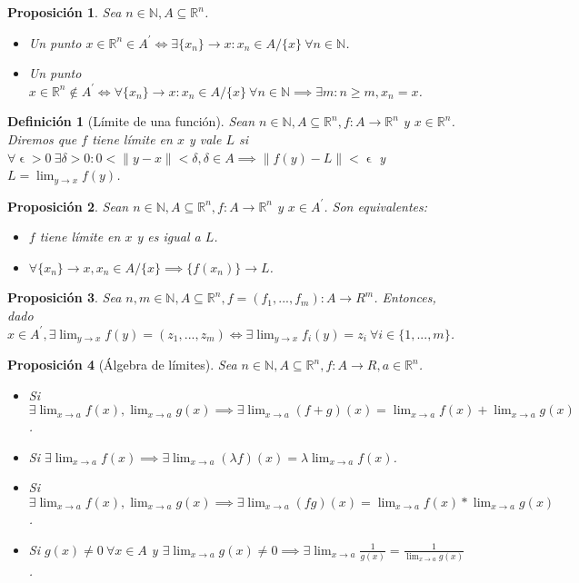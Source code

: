 \documentclass[11pt, a4paper]{article}
\newif\IfInSansMode
\let\epsilon\upvarepsilon
\newcommand{\R}{\mathbb{R}} \newcommand{\N}{\mathbb{N}}
\newcommand{\xn}{\{x_n\}}
\theoremstyle{theorem-style}
\newtheorem{nprop}{Proposición}[section]
\theoremstyle{definition-style}
\newtheorem{ndef}{Definición}[section]
\theoremstyle{remark-style}
\theoremstyle{example-style}
\begin{document}
\begin{nprop}
Sea $n \in \N, A \subseteq \R^n$.

\begin{itemize}
	\item Un punto $x \in \R^n \in A^{'} \Leftrightarrow \exists \xn \to x : x_n \in A/\{x\} \ \forall n \in \N$.
	\item Un punto $x \in \R^n \not\in A^{'} \Leftrightarrow \forall \xn \to x : x_n \in A/\{x\} \ \forall n \in \N \implies \exists m: n \ge m, x_n = x$.
\end{itemize}
\end{nprop}

\begin{ndef}[Límite de una función]
Sean $n \in \N, A \subseteq \R^n, f:A \to \R^n$ y $x \in \R^n$. Diremos que $f$ tiene límite en $x$ y vale $L$ si $ \forall \epsilon > 0 \ \exists \delta > 0: 0 < \|y-x\| < \delta, \delta \in A \implies \|f(y)-L\| < \epsilon$ y $L = \lim_{y \to x} f(y)$.
\end{ndef}

\begin{nprop}
	Sean $n \in \N, A \subseteq \R^n, f:A \to \R^n$ y $x \in A^{'}$. Son equivalentes:
	
	\begin{itemize}
		\item $f$ tiene límite en $x$ y es igual a $L$.
		\item $\forall \xn \to x, x_n \in A/\{x\} \implies \{f(x_n)\} \to L$.
	\end{itemize}
\end{nprop}

\begin{nprop}
	Sea $n,m \in \N, A \subseteq \R^n, f = (f_1,...,f_m):A \to R^m$. Entonces, dado $x \in A^{'}, \exists \lim_{y \to x} f(y) = (z_1,...,z_m) \Leftrightarrow \exists \lim_{y \to x} f_i(y) = z_i \ \forall i \in \{1,...,m\}$.
\end{nprop}

\begin{nprop}[Álgebra de límites]
	Sea $n \in \N, A \subseteq \R^n, f:A \to R, a \in \R^n$. 
	\begin{itemize}
		\item Si $\exists \lim_{x \to a} f(x), \lim_{x \to a} g(x) \implies \exists \lim_{x \to a} (f+g)(x) = \lim_{x \to a} f(x)+\lim_{x \to a} g(x)$.
		\item Si $ \exists \lim_{x \to a} f(x) \implies \exists \lim_{x \to a} (\lambda f)(x) = \lambda \lim_{x \to a} f(x)$.
		\item Si $ \exists \lim_{x \to a} f(x), \lim_{x \to a} g(x) \implies \exists \lim_{x \to a} (fg)(x) = \lim_{x \to a} f(x)*\lim_{x \to a} g(x)$.
		\item Si $g(x) \ne 0 \ \forall x \in A$ y $ \exists \lim_{x \to a} g(x) \ne 0 \implies \exists \lim_{x \to a} \frac{1}{g(x)} = \frac{1}{\lim_{x \to a} g(x)}$.
		\end{itemize}
\end{nprop}
\end{document}
